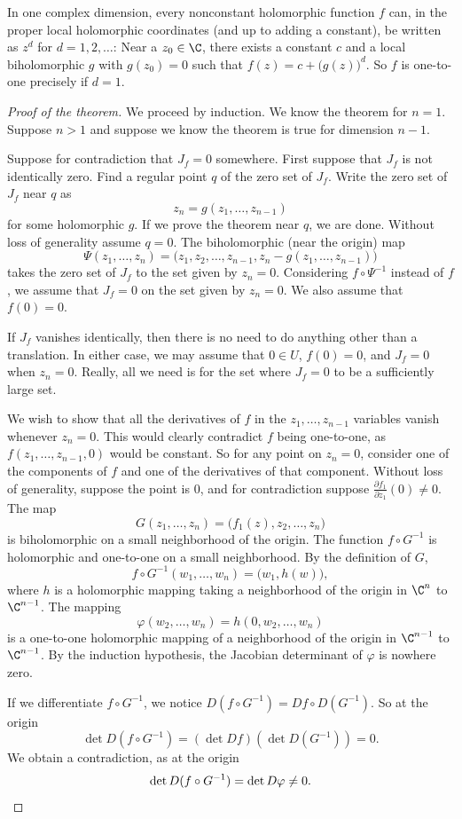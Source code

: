 In one complex dimension, every nonconstant holomorphic function $f$ can, in the proper local holomorphic coordinates (and up to adding a constant), be written as $z^d$ for $d=1,2,\ldots$: Near a $z_0\in\C$, there exists a constant $c$ and a local biholomorphic $g$ with $g(z_0)=0$ such that $f(z)=c+\bigl(g(z)\bigr)^d$. So $f$ is one-to-one precisely if $d=1$.
\begin{proof}[Proof of the theorem]
We proceed by induction. We know the theorem for $n=1$. Suppose $n>1$ and suppose we know the theorem is true for dimension $n-1$.

Suppose for contradiction that $J_f=0$ somewhere. First suppose that $J_f$ is not identically zero. Find a regular point $q$ of the zero set of $J_f$. Write the zero set of $J_f$ near $q$ as
\[z_n=g(z_1,\ldots,z_{n-1})\]
for some holomorphic $g$. If we prove the theorem near $q$, we are done. Without loss of generality assume $q=0$. The biholomorphic (near the origin) map
\[\Psi(z_1,\ldots,z_n)=\bigl(z_1,z_2,\ldots,z_{n-1},z_n-g(z_1,\ldots,z_{n-1})\bigr)\]
takes the zero set of $J_f$ to the set given by $z_n=0$. Considering $f\circ\Psi^{-1}$ instead of $f$, we assume that $J_f=0$ on the set given by $z_n=0$. We also assume that $f(0)=0$.

If $J_f$ vanishes identically, then there is no need to do anything other than a translation. In either case, we may assume that $0\in U$, $f(0)=0$, and $J_f=0$ when $z_n=0$. Really, all we need is for the set where $J_f=0$ to be a sufficiently large set.

We wish to show that all the derivatives of $f$ in the $z_1,\ldots,z_{n-1}$ variables vanish whenever $z_n=0$. This would clearly contradict $f$ being one-to-one, as $f(z_1,\ldots,z_{n-1},0)$ would be constant. So for any point on $z_n=0$, consider one of the components of $f$ and one of the derivatives of that component. Without loss of generality, suppose the point is $0$, and for contradiction suppose $\frac{\partial f_1}{\partial z_1}(0)\ne0$. The map
\[G(z_1,\ldots,z_n)=\bigl(f_1(z),z_2,\ldots,z_n\bigr)\]
is biholomorphic on a small neighborhood of the origin. The function $f\circ G^{-1}$ is holomorphic and one-to-one on a small neighborhood. By the definition of $G$,
\[f\circ G^{-1}(w_1,\ldots,w_n)=\bigl(w_1,h(w)\bigr),\]
where $h$ is a holomorphic mapping taking a neighborhood of the origin in $\C^n$ to $\C^{n-1}$. The mapping
\[\varphi(w_2,\ldots,w_n)=h(0,w_2,\ldots,w_n)\]
is a one-to-one holomorphic mapping of a neighborhood of the origin in $\C^{n-1}$ to $\C^{n-1}$. By the induction hypothesis, the Jacobian determinant of $\varphi$ is nowhere zero.

If we differentiate $f\circ G^{-1}$, we notice $D(f\circ G^{-1})=Df\circ D(G^{-1})$. So at the origin
\[\det D(f\circ G^{-1})=(\det Df)(\det D(G^{-1}))=0.\]
We obtain a contradiction, as at the origin
\[\det D(f\circ G^{-1})=\det D\varphi\ne0.\qedhere\]
\end{proof}
